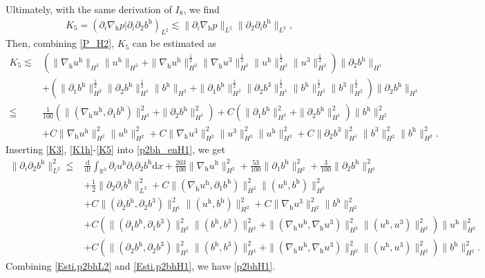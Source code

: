 \documentclass[11pt]{amsart}
\theoremstyle{definition}
\newcommand{\R}{\mathbb{R}}
\newcommand{\h}{\mathrm{h}}
\newcommand{\nablah}{\nabla_{\mathrm{h}}}
\numberwithin{equation}{section}
\begin{document}
Ultimately, with the same derivation of $I_8$, we find
\begin{align*}
	K_{5}=\left(\partial_{i}\nablah p|\partial_{i}\partial_2b^\h\right)_{L^2}\lesssim\|\partial_{i}\nablah p\|_{L^2}\|\partial_2\partial_ib^\h\|_{L^2},
\end{align*}
Then, combining \eqref{P_H2}, $K_5$ can be estimated as
\begin{align}\label{K5}
	K_5\lesssim&\left(\|\nablah u^\h\|_{H^2}\|u^\h\|_{H^2}+ \|\nablah u^\h\|_{H^2}^\frac12\|\nablah u^3\|_{H^2}^\frac12\|u^\h\|_{H^2}^\frac12\|u^3\|_{H^2}^\frac12 \right)\|\partial_2b^\h\|_{H^{1}}\nonumber\\
	&+\left(\|\partial_1b^\h\|_{H^2}^\frac12\|\partial_2b^\h\|_{H^1}^\frac12\|b^\h\|_{H^2}+\|\partial_1b^\h\|_{H^2}^\frac12\|\partial_2b^3\|_{H^1}^\frac12\|b^\h\|_{H^2}^\frac12\|b^3\|_{H^2}^\frac12\right)\|\partial_2b^\h\|_{H^{1}}\nonumber\\
	\leqq&\frac{1}{100}\left(\|(\nablah u^\h,\partial_1b^\h)\|_{H^2}^2+\|\partial_2b^\h\|_{H^{1}}^2\right)+C\left(\| \partial_1b^\h\|_{H^2}^2+\|\partial_2b^\h\|_{H^1}^2\right)\|b^\h\|_{H^2}^2\nonumber\\
	&+C\|\nablah u^\h\|_{H^2}^2\|u^\h\|_{H^2}^2+C\|\nablah u^3\|_{H^2}^2\|u^3\|_{H^2}^2\|u^\h\|_{H^2}^2+C\|\partial_2b^3\|_{H^1}^2\|b^3\|_{H^2}^2\|b^\h\|_{H^2}^2.
\end{align}
Inserting \eqref{K3}, \eqref{K1h}-\eqref{K5} into \eqref{p2bh_enH1}, we get
\begin{align}\label{Esti.p2bhH1}
	\|\partial_{i}\partial_{2}b^\mathrm{h}\|_{L^2}^2\leqq&\frac{\mathrm{d}}{\mathrm{d}t}\int_{\R^3}\partial_{i}u^\h\partial_{i}\partial_{2}b^\h\mathrm{d}x+\frac{203}{100}\|\nablah u^\h\|_{H^2}^2+\frac{53}{100}\|\partial_1 b^\h\|_{H^2}^2+\frac{3}{100}\|\partial_2 b^\h\|_{H^1}^2\nonumber\\
	&+\frac12\|\partial_2 \partial_ib^\h\|_{L^2}^2+C\|(\nabla_{\mathrm{h}}u^\h,\partial_1b^\h)\|_{H^{2}}^2\|(u^\h,b^\h)\|_{H^{2}}^2\nonumber\\
	&+C\|(\partial_2b^\mathrm{h},\partial_2b^3)\|_{H^{1}}^2\|(u^\h,b^\h)\|_{H^{2}}^2+C\|\nabla_{\mathrm{h}}u^3\|_{H^{2}}^2\|b^\h\|_{H^{2}}^2\nonumber\\
	&+C\left(\|(\partial_1b^\h,\partial_1b^3)\|_{H^2}^2\|(b^\h,b^3)\|_{H^2}^2+\|(\nablah u^\h,\nablah u^3)\|_{H^2}^2\|(u^\h,u^3)\|_{H^2}^2\right)\|u^\h\|_{H^2}^2\nonumber\\
	&+C\left(\|(\partial_2b^\h,\partial_2b^3)\|_{H^1}^2\|(b^\h,b^3)\|_{H^2}^2+\|(\nablah u^\h,\nablah u^3)\|_{H^2}^2\|(u^\h,u^3)\|_{H^2}^2\right)\|b^\h\|_{H^2}^2.
\end{align}
Combining \eqref{Esti.p2bhL2} and \eqref{Esti.p2bhH1}, we have \eqref{p2bhH1}.
\end{document}
